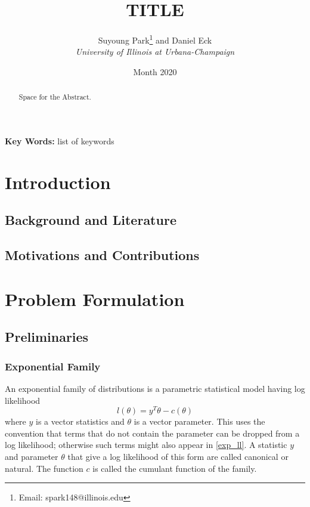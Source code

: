 \documentclass[11pt]{extarticle}
\title{\textbf{TITLE}}
\author{Suyoung Park\thanks{Email: spark148@illinois.edu} \text{ }and Daniel Eck\\
\emph{University of Illinois at Urbana-Champaign}}
\date{Month 2020}
\begin{document}
\maketitle
\begin{abstract}
    Space for the Abstract.    
\end{abstract}
\smallskip
\noindent \textbf{Key Words:} list of keywords

\section{Introduction}
\subsection{Background and Literature}
\subsection{Motivations and Contributions}

\section{Problem Formulation}
\subsection{Preliminaries}
\subsubsection{Exponential Family}
An exponential family of distributions is a parametric statistical model having log likelihood
\begin{equation}\label{exp_ll}
    l(\theta)=y^T\theta-c(\theta)
\end{equation}
where $y$ is a vector statistics and $\theta$ is a vector parameter. This uses the convention that terms that do not contain the parameter can be dropped from a log likelihood; otherwise such terms might also appear in \ref{exp_ll}. A statistic $y$ and parameter $\theta$ that give a log likelihood of this form are called canonical or natural. The function $c$ is called the cumulant function of the family.
\end{document}
